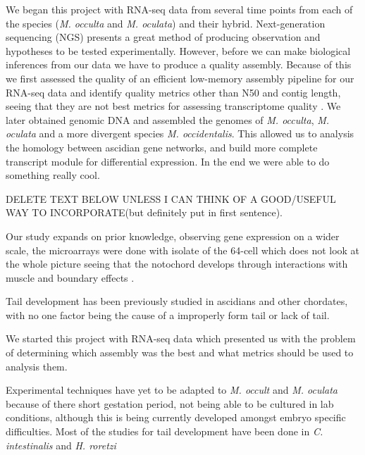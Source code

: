 We began this project with RNA-seq data from several time points from each of the species (\textit{M. occulta} and \textit{M. oculata}) and their hybrid. Next-generation sequencing (NGS) presents a great method of producing observation and hypotheses to be tested experimentally. However, before we can make biological inferences from our data we have to produce a quality assembly. Because of this we first assessed the quality of an efficient low-memory assembly pipeline for our RNA-seq data and identify quality metrics other than N50 and contig length, seeing that they are not best metrics for assessing transcriptome quality \cite{oneil_assessing_2013}. We later obtained genomic DNA and assembled the genomes of \textit{M. occulta}, \textit{M. oculata} and a more divergent species \textit{M. occidentalis}. This allowed us to analysis the homology between ascidian gene networks, and build more complete transcript module for differential expression\cite{vijay_challenges_2012}. In the end we were able to do something really cool.

DELETE TEXT BELOW UNLESS I CAN THINK OF A GOOD/USEFUL WAY TO INCORPORATE(but definitely put in first  sentence). 

Our study expands on prior knowledge, observing gene expression on a wider scale, the microarrays were done with isolate of the 64-cell which does not look at the whole picture seeing that the notochord develops through interactions with muscle and boundary effects \cite{keller_mechanisms_2000,veeman_chongmague_2008}.

Tail development has been previously studied in ascidians and other chordates, with no one factor being the cause of a improperly form tail or lack of tail. 

We started this project with RNA-seq data which presented us with the problem of determining which assembly was the best and what metrics should be used to analysis them.

Experimental techniques have yet to be adapted to \textit{M. occult} and \textit{M. oculata} because of there short gestation period, not being able to be cultured in lab conditions, although this is being currently developed amongst embryo specific difficulties. Most of the studies for tail development have been done in \textit{C. intestinalis} and \textit{H. roretzi}  
